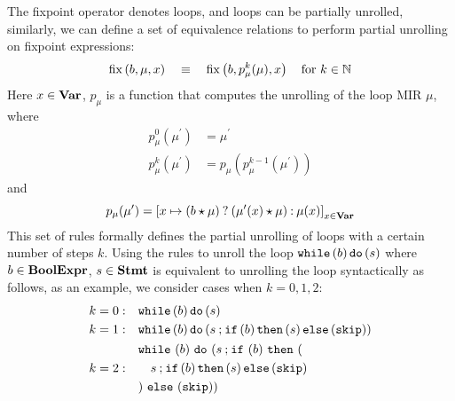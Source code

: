 The fixpoint operator denotes loops, and loops can be partially unrolled,
similarly, we can define a set of equivalence relations to perform partial
unrolling on fixpoint expressions:
\begin{equation}
    \operatorname{\mathrm{fix}}\left({b, \mu, x}\right)
    \quad \equiv \quad
    \operatorname{\mathrm{fix}}\left({b, p_\mu^k(\mu), x}\right) \quad \text{for $k \in \mathbb{N}$}
    \label{po:eq:unroll}
\end{equation}
Here $x \in \mathbf{Var}$, $p_\mu$ is a function that computes the unrolling
of the loop MIR $\mu$, where
\begin{align}
    p_\mu^0(\mu^\prime) &= \mu^\prime \\
    p_\mu^k(\mu^\prime) &= p_\mu(p_\mu^{k - 1}(\mu^\prime))
\end{align}
and 
\begin{equation}
    p_\mu(\mu^\prime) = {\left[
        x \mapsto ( b \mathbin{\star} \mu ) \mathbin{?}
            ( \mu^\prime(x) \mathbin{\star} \mu ) \mathbin{:} \mu(x)
    \right]}_{x \in \mathbf{Var}}
\end{equation}
This set of rules formally defines the partial unrolling of loops with
a certain number of steps $k$.  Using the rules to unroll the loop
$\texttt{while} \left(b\right) \texttt{do} \left(s\right)$ where $b \in \mathbf{BoolExpr}$, $s \in \mathbf{Stmt}$ is equivalent to
unrolling the loop syntactically as follows, as an example, we consider cases
when $k = 0, 1, 2$:
\begin{equation}
    \begin{aligned}
        k = 0: & \quad
        \texttt{while} \left(b\right) \texttt{do} \left(s\right) \\
        k = 1: & \quad
        \texttt{while} \left(b\right) \texttt{do} \left(s \mathbin{;} \texttt{if} \left(b\right) \texttt{then} \left(s\right) \texttt{else} \left(\mathtt{skip}\right)\right) \\
        k = 2: & \quad
        \begin{aligned}
            & \texttt{while}~(b)~\texttt{do}~(
                s \mathbin{;} \texttt{if}~(b)~\texttt{then}~( \\
            & \quad s \mathbin{;} \texttt{if} \left(b\right) \texttt{then} \left(s\right) \texttt{else} \left(\mathtt{skip}\right) \\
            & )~\texttt{else}~(\mathtt{skip}))
        \end{aligned}
    \end{aligned}
\end{equation}

